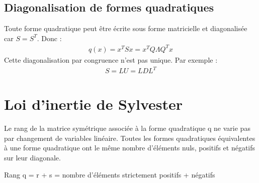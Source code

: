 \documentclass[a4paper]{book}
\begin{document}
\subsection{Diagonalisation de formes quadratiques}
Toute forme quadratique peut être écrite sous forme matricielle et diagonalisée car $S = S^T$. Donc :
\begin{gather}
    q(x) = x^TSx = x^TQ\Lambda Q^Tx
\end{gather}
Cette diagonalisation par congruence n'est pas unique. Par exemple :
\begin{gather}
    S = LU = LDL^T
\end{gather}
\section{Loi d'inertie de Sylvester}
Le rang de la matrice symétrique associée à la forme quadratique q ne varie pas par changement de variables linéaire.
\newline \indent Toutes les formes quadratiques équivalentes à une forme quadratique ont le même nombre d'éléments nuls, positifs et négatifs sur leur diagonale. 
\begin{framed}
    Rang q = r + s = nombre d'éléments strictement positifs + négatifs
\end{framed}
\end{document}

